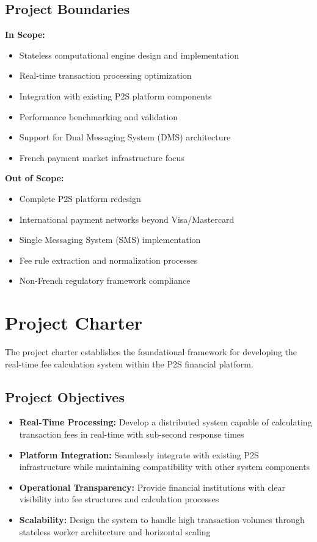 \subsection{Project Boundaries}

\textbf{In Scope:}
\begin{itemize}
    \item Stateless computational engine design and implementation
    \item Real-time transaction processing optimization
    \item Integration with existing P2S platform components
    \item Performance benchmarking and validation
    \item Support for Dual Messaging System (DMS) architecture
    \item French payment market infrastructure focus
\end{itemize}

\textbf{Out of Scope:}
\begin{itemize}
    \item Complete P2S platform redesign
    \item International payment networks beyond Visa/Mastercard
    \item Single Messaging System (SMS) implementation
    \item Fee rule extraction and normalization processes
    \item Non-French regulatory framework compliance
\end{itemize}

\section{Project Charter}

The project charter establishes the foundational framework for developing the real-time fee calculation system within the P2S financial platform.

\subsection{Project Objectives}

\begin{itemize}
    \item \textbf{Real-Time Processing:} Develop a distributed system capable of calculating transaction fees in real-time with sub-second response times
    \item \textbf{Platform Integration:} Seamlessly integrate with existing P2S infrastructure while maintaining compatibility with other system components
    \item \textbf{Operational Transparency:} Provide financial institutions with clear visibility into fee structures and calculation processes
    \item \textbf{Scalability:} Design the system to handle high transaction volumes through stateless worker architecture and horizontal scaling
\end{itemize}

